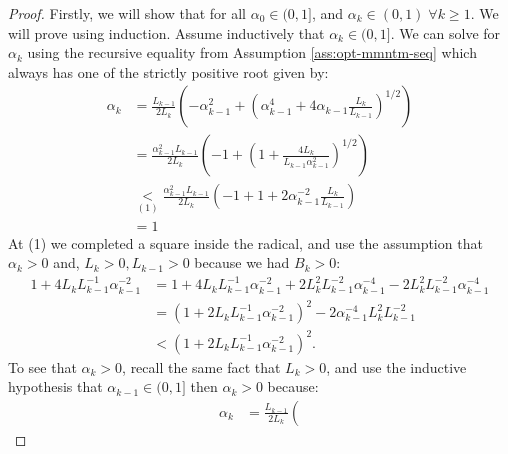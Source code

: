 \documentclass[12pt]{article}
\begin{document}
        \begin{proof}
            Firstly, we will show that for all $\alpha_0 \in (0, 1]$, and $\alpha_k \in (0, 1)\;\forall k \ge 1$. 
            We will prove using induction.
            Assume inductively that $\alpha_k \in (0, 1]$. 
            We can solve for $\alpha_k$ using the recursive equality from Assumption \ref{ass:opt-mmntm-seq} which always has one of the strictly positive root given by: 
            \begin{align*}
                \alpha_k &=
                \frac{L_{k - 1}}{2L_k}\left(
                    - \alpha_{k - 1}^2 + \left(
                        \alpha_{k - 1}^4 + 4 \alpha_{k - 1}\frac{L_k}{L_{k - 1}}
                    \right)^{1/2}
                \right)
                \\
                &= \frac{\alpha_{k - 1}^2L_{k - 1}}{2L_k}\left(
                    - 1 + \left(
                        1 + \frac{4 L_k}{L_{k - 1}\alpha_{k-1}^2}
                    \right)^{1/2}
                \right)
                \\
                &\underset{(1)}{<} \frac{\alpha_{k - 1}^2L_{k - 1}}{2L_k}\left(
                    - 1 + 1 + 2 \alpha_{k - 1}^{-2}\frac{L_k}{L_{k - 1}}
                \right)
                \\
                &= 1
            \end{align*}
            At (1) we completed a square inside the radical, and use the assumption that $\alpha_k > 0$ and, $L_k > 0, L_{k - 1} > 0$ because we had $B_k > 0$: 
            \begin{align*}
                1 + 4 L_{k}L_{k - 1}^{-1}\alpha_{k - 1}^{-2}
                &= 
                1 + 4 L_{k}L_{k - 1}^{-1}\alpha_{k - 1}^{-2}
                + 2L_k^2L_{k - 1}^{-2}\alpha_{k - 1}^{-4}
                - 2L_k^2L_{k - 1}^{-2}\alpha_{k - 1}^{-4}
                \\
                &= (1 + 2L_kL_{k - 1}^{-1}\alpha_{k - 1}^{-2})^2
                - 2\alpha_{k - 1}^{-4}L_k^2L_{k - 1}^{-2}
                \\
                &< \left(1 + 2L_kL_{k - 1}^{-1}\alpha_{k - 1}^{-2}\right)^2. 
            \end{align*}
            To see that $\alpha_k > 0$, recall the same fact that $L_k > 0$, and use the inductive hypothesis that $\alpha_{k - 1} \in (0, 1]$ then $\alpha_k > 0$ because: 
            \begin{align*}
                \alpha_k &=
                \frac{L_{k - 1}}{2L_k}\left(

\end{align*}
\end{proof}
\end{document}
